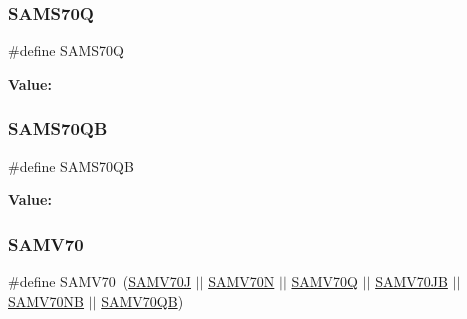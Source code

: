 \subsubsection{\texorpdfstring{SAMS70Q}{SAMS70Q}}
{\footnotesize\ttfamily \#define S\+A\+M\+S70Q}

{\bfseries Value\+:}
\begin{DoxyCode}{0}
\DoxyCodeLine{( \(\backslash\)}
\DoxyCodeLine{    )}

\end{DoxyCode}
\mbox{\label{group__sam__part__macros__group_ga7597e22e69b9ad51c748d9fbcc3c0a9e}} 
\subsubsection{\texorpdfstring{SAMS70QB}{SAMS70QB}}
{\footnotesize\ttfamily \#define S\+A\+M\+S70\+QB}

{\bfseries Value\+:}
\begin{DoxyCode}{0}
\DoxyCodeLine{( \(\backslash\)}
\DoxyCodeLine{    )}

\end{DoxyCode}
\mbox{\label{group__sam__part__macros__group_gab470f27e045fe99f2b64bb30d5802282}} 
\subsubsection{\texorpdfstring{SAMV70}{SAMV70}}
{\footnotesize\ttfamily \#define S\+A\+M\+V70~(\mbox{\hyperlink{group__sam__part__macros__group_gaa6cb4c3856c6856a57ec9f443d239527}{S\+A\+M\+V70J}} $\vert$$\vert$ \mbox{\hyperlink{group__sam__part__macros__group_ga03d76f8d5034b894e50dabd497e64992}{S\+A\+M\+V70N}} $\vert$$\vert$ \mbox{\hyperlink{group__sam__part__macros__group_ga70156b9e7c7f2ac6eaf8e04f73e01801}{S\+A\+M\+V70Q}} $\vert$$\vert$ \mbox{\hyperlink{group__sam__part__macros__group_ga5ec7d7853fd7dc3b0d5e686f3f2df869}{S\+A\+M\+V70\+JB}} $\vert$$\vert$ \mbox{\hyperlink{group__sam__part__macros__group_ga2bafab3273c42c12eb7180d70de301df}{S\+A\+M\+V70\+NB}} $\vert$$\vert$ \mbox{\hyperlink{group__sam__part__macros__group_ga560e2809040715920c242312dbe99b17}{S\+A\+M\+V70\+QB}})}

